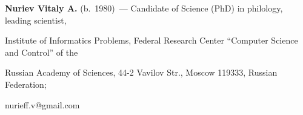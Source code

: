 \noindent


\textbf{Nuriev Vitaly A.} (b.\ 1980)~--- Candidate of Science (PhD) in philology, leading scientist, 


Institute of Informatics Problems, Federal Research Center ``Computer Science and Control'' of the 


Russian Academy of Sciences, 44-2 Vavilov Str., Moscow 119333, Russian Federation; 


\mbox{nurieff.v@gmail.com}





\label{end\stat}





\renewcommand{\bibname}{\protect\rm Литература} 


